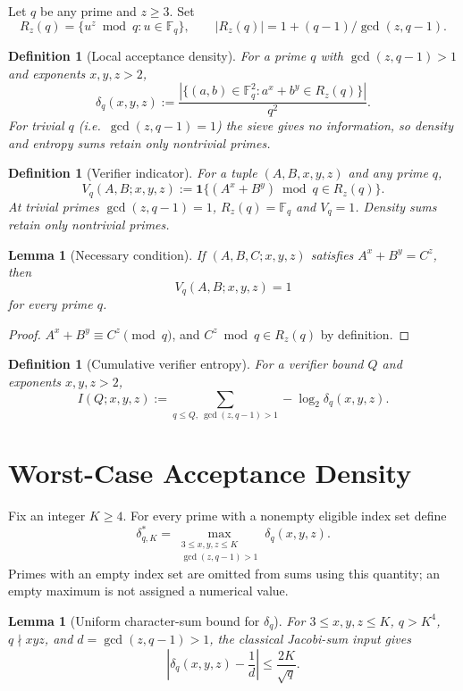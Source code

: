 \documentclass[11pt,a4paper]{article}
\newtheorem{lemma}[theorem]{Lemma}
\newtheorem{definition}[theorem]{Definition}
\begin{document}
Let $q$ be any prime and $z \ge 3$. Set
\[
  R_z(q) = \{u^z \bmod q : u \in \mathbb{F}_q\},
  \qquad
  |R_z(q)| = 1 + (q-1)/\gcd(z,q-1).
\]

\begin{definition}[Local acceptance density]
\label{def:delta}
For a prime $q$ with $\gcd(z,q-1)>1$ and exponents $x,y,z>2$,
\[
  \delta_q(x,y,z) :=
    \frac{|\{(a,b)\in \mathbb{F}_q^2 : a^x+b^y \in R_z(q)\}|}{q^2}.
\]
For trivial $q$ (i.e.\ $\gcd(z,q-1)=1$) the sieve gives no information,
so density and entropy sums retain only nontrivial primes.
\end{definition}

\begin{definition}[Verifier indicator]
\label{def:Vq}
For a tuple $(A,B,x,y,z)$ and any prime $q$,
\[
  V_q(A,B;x,y,z) :=
    \mathbf{1}\bigl\{(A^x+B^y) \bmod q \in R_z(q)\bigr\}.
\]
At trivial primes $\gcd(z,q-1)=1$, $R_z(q)=\mathbb F_q$ and
$V_q=1$. Density sums retain only nontrivial primes.
\end{definition}

\begin{lemma}[Necessary condition]
\label{lem:necessary}
If $(A,B,C;x,y,z)$ satisfies $A^x+B^y=C^z$, then
\[
  V_q(A,B;x,y,z)=1
\]
for every prime $q$.
\end{lemma}

\begin{proof}
$A^x+B^y \equiv C^z \pmod q$, and $C^z \bmod q \in R_z(q)$ by
definition.
\end{proof}

\begin{definition}[Cumulative verifier entropy]
\label{def:Iverifier}
For a verifier bound $Q$ and exponents $x,y,z>2$,
\[
  I(Q;x,y,z) := \sum_{q \le Q,\ \gcd(z,q-1)>1} -\log_2 \delta_q(x,y,z).
\]
\end{definition}

\section{Worst-Case Acceptance Density}

Fix an integer $K\ge4$. For every prime with a nonempty eligible
index set define
\[
 \delta_{q,K}^{*}=\max_{\substack{3\le x,y,z\le K\\
                         \gcd(z,q-1)>1}}\delta_q(x,y,z).
\]
Primes with an empty index set are omitted from sums using this
quantity; an empty maximum is not assigned a numerical value.

\begin{lemma}[Uniform character-sum bound for $\delta_q$]
\label{lem:weil}
For $3\le x,y,z\le K$, $q>K^4$, $q\nmid xyz$, and
$d=\gcd(z,q-1)>1$, the classical Jacobi-sum input gives
\[
 \left|\delta_q(x,y,z)-\frac1d\right|\le\frac{2K}{\sqrt q}.
\]
\end{lemma}
\end{document}
